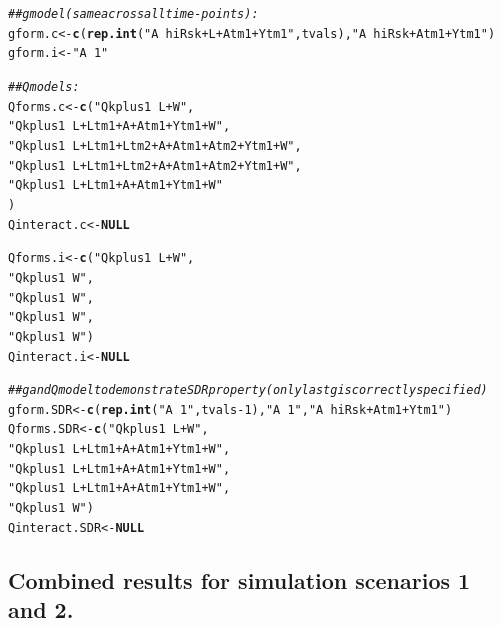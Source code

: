 \documentclass{article}\usepackage[]{graphicx}\usepackage[]{color}
\makeatletter
\newcommand{\hlnum}[1]{\textcolor[rgb]{0.686,0.059,0.569}{#1}}%
\newcommand{\hlstr}[1]{\textcolor[rgb]{0.192,0.494,0.8}{#1}}%
\newcommand{\hlcom}[1]{\textcolor[rgb]{0.678,0.584,0.686}{\textit{#1}}}%
\newcommand{\hlopt}[1]{\textcolor[rgb]{0,0,0}{#1}}%
\newcommand{\hlstd}[1]{\textcolor[rgb]{0.345,0.345,0.345}{#1}}%
\newcommand{\hlkwa}[1]{\textcolor[rgb]{0.161,0.373,0.58}{\textbf{#1}}}%
\newcommand{\hlkwb}[1]{\textcolor[rgb]{0.69,0.353,0.396}{#1}}%
\newcommand{\hlkwd}[1]{\textcolor[rgb]{0.737,0.353,0.396}{\textbf{#1}}}%
\newenvironment{kframe}{%
 \def\at@end@of@kframe{}%
 \ifinner\ifhmode%
  \def\at@end@of@kframe{\end{minipage}}%
  \begin{minipage}{\columnwidth}%
 \fi\fi%
 \def\FrameCommand##1{\hskip\@totalleftmargin \hskip-\fboxsep
 \colorbox{shadecolor}{##1}\hskip-\fboxsep
     \hskip-\linewidth \hskip-\@totalleftmargin \hskip\columnwidth}%
 \MakeFramed {\advance\hsize-\width
   \@totalleftmargin\z@ \linewidth\hsize
   \@setminipage}}%
 {\par\unskip\endMakeFramed%
 \at@end@of@kframe}
\newenvironment{knitrout}{}{} %
\makeatother
\begin{document}
\begin{knitrout}
\color{fgcolor}\begin{kframe}
\begin{alltt}
\hlcom{## g model (same across all time-points):}
\hlstd{gform.c} \hlkwb{<-} \hlkwd{c}\hlstd{(}\hlkwd{rep.int}\hlstd{(}\hlstr{"A ~ hiRsk + L + Atm1 + Ytm1"}\hlstd{, tvals),} \hlstr{"A ~ hiRsk + Atm1 + Ytm1"}\hlstd{)}
\hlstd{gform.i} \hlkwb{<-} \hlstr{"A ~ 1"}

\hlcom{## Q models:}
\hlstd{Qforms.c} \hlkwb{<-} \hlkwd{c}\hlstd{(}\hlstr{"Qkplus1 ~ L + W"}\hlstd{,}
              \hlstr{"Qkplus1 ~ L + Ltm1 + A + Atm1 + Ytm1 + W"}\hlstd{,}
              \hlstr{"Qkplus1 ~ L + Ltm1 + Ltm2 + A + Atm1 + Atm2 + Ytm1 + W"}\hlstd{,}
              \hlstr{"Qkplus1 ~ L + Ltm1 + Ltm2 + A + Atm1 + Atm2 + Ytm1 + W"}\hlstd{,}
              \hlstr{"Qkplus1 ~ L + Ltm1 + A + Atm1 + Ytm1 + W"}
              \hlstd{)}
\hlstd{Qinteract.c} \hlkwb{<-} \hlkwa{NULL}

\hlstd{Qforms.i} \hlkwb{<-} \hlkwd{c}\hlstd{(}\hlstr{"Qkplus1 ~ L + W"}\hlstd{,}
              \hlstr{"Qkplus1 ~ W"}\hlstd{,}
              \hlstr{"Qkplus1 ~ W"}\hlstd{,}
              \hlstr{"Qkplus1 ~ W"}\hlstd{,}
              \hlstr{"Qkplus1 ~ W"}\hlstd{)}
\hlstd{Qinteract.i} \hlkwb{<-} \hlkwa{NULL}

\hlcom{## g and Q model to demonstrate SDR property (only last g is correctly specified)}
\hlstd{gform.SDR} \hlkwb{<-} \hlkwd{c}\hlstd{(}\hlkwd{rep.int}\hlstd{(}\hlstr{"A ~ 1"}\hlstd{, tvals}\hlopt{-}\hlnum{1}\hlstd{),} \hlstr{"A ~ 1"}\hlstd{,} \hlstr{"A ~ hiRsk + Atm1 + Ytm1"}\hlstd{)}
\hlstd{Qforms.SDR} \hlkwb{<-} \hlkwd{c}\hlstd{(}\hlstr{"Qkplus1 ~ L + W"}\hlstd{,}
                \hlstr{"Qkplus1 ~ L + Ltm1 + A + Atm1 + Ytm1 + W"}\hlstd{,}
                \hlstr{"Qkplus1 ~ L + Ltm1 + A + Atm1 + Ytm1 + W"}\hlstd{,}
                \hlstr{"Qkplus1 ~ L + Ltm1 + A + Atm1 + Ytm1 + W"}\hlstd{,}
                \hlstr{"Qkplus1 ~ W"}\hlstd{)}
\hlstd{Qinteract.SDR} \hlkwb{<-} \hlkwa{NULL}
\end{alltt}
\end{kframe}
\end{knitrout}

\clearpage
\subsection{Combined results for simulation scenarios 1 and 2.}
\end{document}
